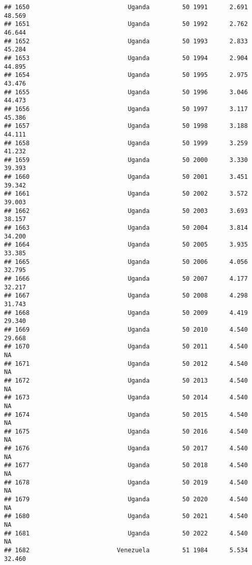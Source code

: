 \documentclass[
]{article}
\begin{document}
\begin{verbatim}
## 1650                           Uganda         50 1991      2.691     48.569
## 1651                           Uganda         50 1992      2.762     46.644
## 1652                           Uganda         50 1993      2.833     45.284
## 1653                           Uganda         50 1994      2.904     44.895
## 1654                           Uganda         50 1995      2.975     43.476
## 1655                           Uganda         50 1996      3.046     44.473
## 1656                           Uganda         50 1997      3.117     45.386
## 1657                           Uganda         50 1998      3.188     44.111
## 1658                           Uganda         50 1999      3.259     41.232
## 1659                           Uganda         50 2000      3.330     39.393
## 1660                           Uganda         50 2001      3.451     39.342
## 1661                           Uganda         50 2002      3.572     39.003
## 1662                           Uganda         50 2003      3.693     38.157
## 1663                           Uganda         50 2004      3.814     34.200
## 1664                           Uganda         50 2005      3.935     33.385
## 1665                           Uganda         50 2006      4.056     32.795
## 1666                           Uganda         50 2007      4.177     32.217
## 1667                           Uganda         50 2008      4.298     31.743
## 1668                           Uganda         50 2009      4.419     29.340
## 1669                           Uganda         50 2010      4.540     29.668
## 1670                           Uganda         50 2011      4.540         NA
## 1671                           Uganda         50 2012      4.540         NA
## 1672                           Uganda         50 2013      4.540         NA
## 1673                           Uganda         50 2014      4.540         NA
## 1674                           Uganda         50 2015      4.540         NA
## 1675                           Uganda         50 2016      4.540         NA
## 1676                           Uganda         50 2017      4.540         NA
## 1677                           Uganda         50 2018      4.540         NA
## 1678                           Uganda         50 2019      4.540         NA
## 1679                           Uganda         50 2020      4.540         NA
## 1680                           Uganda         50 2021      4.540         NA
## 1681                           Uganda         50 2022      4.540         NA
## 1682                        Venezuela         51 1984      5.534     32.460

\end{verbatim}
\end{document}
